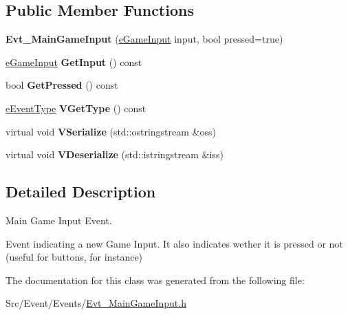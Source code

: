 \subsection*{Public Member Functions}
\begin{DoxyCompactItemize}
\item 
\hypertarget{classEvt__MainGameInput_a86ce6de00a1907b31277e26b3b0d388a}{{\bfseries Evt\-\_\-\-Main\-Game\-Input} (\hyperlink{Evt__MainGameInput_8h_a07202ebcaf9ce6b65765d3e09f5191f0}{e\-Game\-Input} input, bool pressed=true)}\label{classEvt__MainGameInput_a86ce6de00a1907b31277e26b3b0d388a}

\item 
\hypertarget{classEvt__MainGameInput_a8c96770c3a241aa3803de28184b1072f}{\hyperlink{Evt__MainGameInput_8h_a07202ebcaf9ce6b65765d3e09f5191f0}{e\-Game\-Input} {\bfseries Get\-Input} () const }\label{classEvt__MainGameInput_a8c96770c3a241aa3803de28184b1072f}

\item 
\hypertarget{classEvt__MainGameInput_ac9154d96a64b9dc9b4155156999f69da}{bool {\bfseries Get\-Pressed} () const }\label{classEvt__MainGameInput_ac9154d96a64b9dc9b4155156999f69da}

\item 
\hypertarget{classEvt__MainGameInput_a3141e4d4da13cb9e98db1e117040fc59}{\hyperlink{IEvent_8h_a052e637824ed8cb8a5e9d5d73b5b3c8b}{e\-Event\-Type} {\bfseries V\-Get\-Type} () const }\label{classEvt__MainGameInput_a3141e4d4da13cb9e98db1e117040fc59}

\item 
\hypertarget{classEvt__MainGameInput_a48fb0a8845a035216b931d1fa19c69c1}{virtual void {\bfseries V\-Serialize} (std\-::ostringstream \&oss)}\label{classEvt__MainGameInput_a48fb0a8845a035216b931d1fa19c69c1}

\item 
\hypertarget{classEvt__MainGameInput_ae345bc9eefff37ba9c822fd030374d43}{virtual void {\bfseries V\-Deserialize} (std\-::istringstream \&iss)}\label{classEvt__MainGameInput_ae345bc9eefff37ba9c822fd030374d43}

\end{DoxyCompactItemize}


\subsection{Detailed Description}
Main Game Input Event. 

Event indicating a new Game Input. It also indicates wether it is pressed or not (useful for buttons, for instance) 

The documentation for this class was generated from the following file\-:\begin{DoxyCompactItemize}
\item 
Src/\-Event/\-Events/\hyperlink{Evt__MainGameInput_8h}{Evt\-\_\-\-Main\-Game\-Input.\-h}\end{DoxyCompactItemize}
